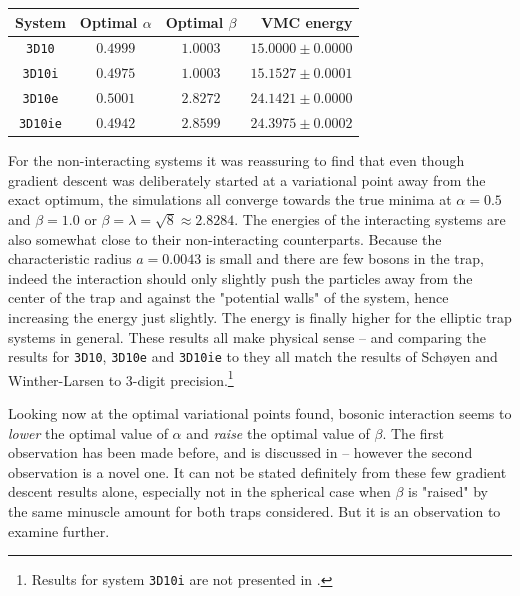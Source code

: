 \documentclass[a4paper,8pt]{article}
\begin{document}
\begin{multicols}{2}
\begin{center}\small
{}
\label{gd3D10}
\begin{tabular}{cccr}
	\hline\hline
	System & Optimal $\alpha$ & Optimal $\beta$ & VMC energy \\
	\hline
    \texttt{3D10} & $0.4999$ & $1.0003$ & $15.0000 \pm 0.0000$\\
    \texttt{3D10i} & $0.4975$ & $1.0003$ & $15.1527 \pm 0.0001$\\ 
    \texttt{3D10e} & $0.5001$ & $2.8272$ & $24.1421 \pm 0.0000$\\
    \texttt{3D10ie} & $0.4942$ & $2.8599$ & $24.3975 \pm 0.0002$\\
    \hline\hline
\end{tabular}
\end{center}

For the non-interacting systems it was reassuring to find that even though gradient descent was deliberately started at a variational point away from the exact optimum, the simulations all converge towards the true minima at ${\alpha = 0.5}$ and ${\beta = 1.0}$ or ${\beta = \lambda} = {\sqrt{8} \approx 2.8284}$. The energies of the interacting systems are also somewhat close to their non-interacting counterparts. Because the characteristic radius ${a = 0.0043}$ is small and there are few bosons in the trap, indeed the interaction should only slightly push the particles away from the center of the trap and against the "potential walls" of the system, hence increasing the energy just slightly. The energy is finally higher for the elliptic trap systems in general. These results all make physical sense -- and comparing the results for \texttt{3D10}, \texttt{3D10e} and \texttt{3D10ie} to \cite{SWL} they all match the results of Schøyen and Winther-Larsen to 3-digit precision.\footnote{Results for system \texttt{3D10i} are not presented in \cite{SWL}.}

Looking now at the optimal variational points found, bosonic interaction seems to \textit{lower} the optimal value of $\alpha$ and \textit{raise} the optimal value of $\beta$. The first observation has been made before, and is discussed in \cite{SWL} -- however the second observation is a novel one. It can not be stated definitely from these few gradient descent results alone, especially not in the spherical case when $\beta$ is "raised" by the same minuscle amount for both traps considered. But it is an observation to examine further.


\end{multicols}
\end{document}
